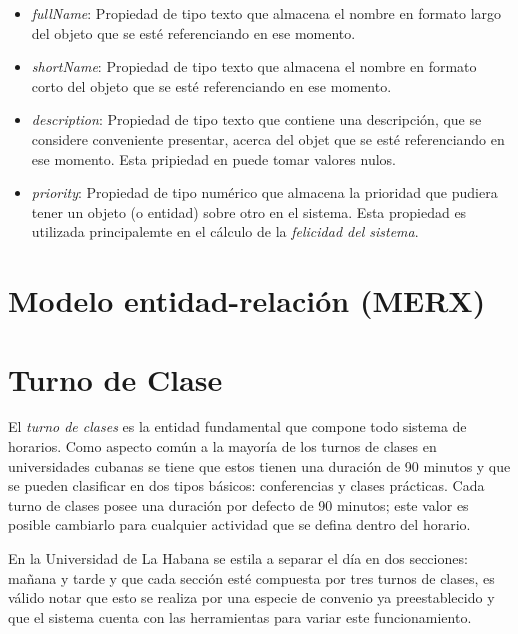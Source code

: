\label{props:base}
\begin{itemize}
	\item \textsl{fullName}: Propiedad de tipo texto que almacena el nombre en formato largo del objeto que se esté referenciando en ese momento. 
	\item \textsl{shortName}: Propiedad de tipo texto que almacena el nombre en formato corto del objeto que se esté referenciando en ese momento. 
	\item \textsl{description}: Propiedad de tipo texto que contiene una descripción, que se considere conveniente presentar, acerca del objet que se esté referenciando en ese momento. Esta pripiedad en puede tomar valores nulos.
	\item \textsl{priority}: Propiedad de tipo numérico que almacena la prioridad que pudiera tener un objeto (o entidad) sobre otro en el sistema. Esta propiedad es utilizada principalemte en el cálculo de la \textit{felicidad del sistema}.

\end{itemize}



\section{Modelo entidad-relación (MERX)}


\section{Turno de Clase}
\label{sec:classes}

El \textit{turno de clases} es la entidad fundamental que compone todo sistema de horarios. Como aspecto común a la mayoría de los turnos de clases en universidades cubanas se tiene que estos tienen una duración de 90 minutos y que se pueden clasificar en dos tipos básicos: conferencias y clases prácticas. Cada turno de clases posee una duración por defecto de 90 minutos; este valor es posible cambiarlo para cualquier actividad que se defina dentro del horario. 

En la Universidad de La Habana se estila a separar el día en dos secciones: mañana y tarde y que cada sección esté compuesta por tres turnos de clases, es válido notar que esto se realiza por una especie de convenio ya preestablecido y que el sistema cuenta con las herramientas para variar este funcionamiento. 

